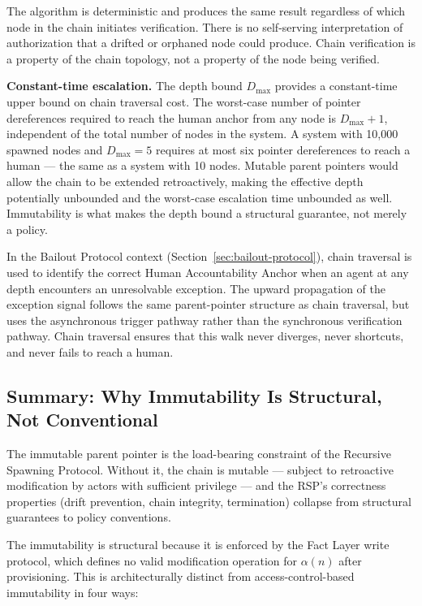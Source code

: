 The algorithm is deterministic and produces the same result regardless of which node in the chain initiates verification. There is no self-serving interpretation of authorization that a drifted or orphaned node could produce. Chain verification is a property of the chain topology, not a property of the node being verified.

\medskip
\noindent\textbf{Constant-time escalation.} The depth bound $D_{\max}$ provides a constant-time upper bound on chain traversal cost. The worst-case number of pointer dereferences required to reach the human anchor from any node is $D_{\max} + 1$, independent of the total number of nodes in the system. A system with 10,000 spawned nodes and $D_{\max} = 5$ requires at most six pointer dereferences to reach a human --- the same as a system with 10 nodes. Mutable parent pointers would allow the chain to be extended retroactively, making the effective depth potentially unbounded and the worst-case escalation time unbounded as well. Immutability is what makes the depth bound a structural guarantee, not merely a policy.

In the Bailout Protocol context (Section~\ref{sec:bailout-protocol}), chain traversal is used to identify the correct Human Accountability Anchor when an agent at any depth encounters an unresolvable exception. The upward propagation of the exception signal follows the same parent-pointer structure as chain traversal, but uses the asynchronous trigger pathway rather than the synchronous verification pathway. Chain traversal ensures that this walk never diverges, never shortcuts, and never fails to reach a human.

\subsection{Summary: Why Immutability Is Structural, Not Conventional}
\label{sec:immutability-structural-summary}

The immutable parent pointer is the load-bearing constraint of the Recursive Spawning Protocol. Without it, the chain is mutable --- subject to retroactive modification by actors with sufficient privilege --- and the RSP's correctness properties (drift prevention, chain integrity, termination) collapse from structural guarantees to policy conventions.

The immutability is structural because it is enforced by the Fact Layer write protocol, which defines no valid modification operation for $\alpha(n)$ after provisioning. This is architecturally distinct from access-control-based immutability in four ways:

